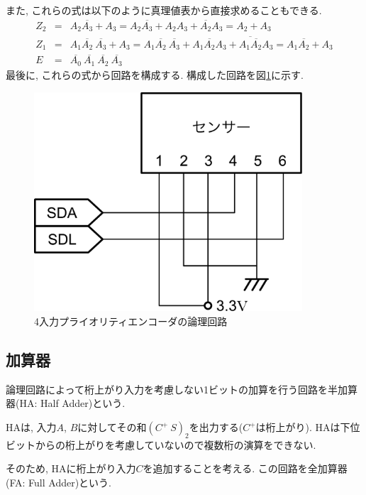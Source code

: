 \documentclass[titlepage]{jsarticle}
\begin{document}
    また, これらの式は以下のように真理値表から直接求めることもできる.
    \begin{eqnarray*}
      Z_2 &=& A_2 \overline{A_3} + A_3 =
        A_2 \overline{A_3} + A_2A_3 + \overline{A_2}A_3 =
        A_2 + A_3 \\
      Z_1 &=& A_1 \overline{A_2} \ \overline{A_3} + A_3 =
        A_1 \overline{A_2} \ \overline{A_3} + A_1 \overline{A_2}A_3 +
          \overline{A_1 \overline{A_2}} A_3 =
        A_1 \overline{A_2} + A_3 \\
      E &=& \overline{A_0} \ \overline{A_1} \ \overline{A_2} \ \overline{A_3}
    \end{eqnarray*}
    最後に, これらの式から回路を構成する.
    構成した回路を図\ref{fig:priority_encoder}に示す.
    \begin{figure}[h]
      \centering
      \includegraphics[width=10cm]{images/haisen.pdf}
      \caption{4入力プライオリティエンコーダの論理回路}
      \label{fig:priority_encoder}
    \end{figure}
  \subsection{加算器} \label{subsec:FA}
    論理回路によって桁上がり入力を考慮しない1ビットの加算を行う回路を半加算器(HA: Half Adder)という.

    HAは, 入力$A$, $B$に対してその和$(C^+ \ S)_2$を出力する($C^+$は桁上がり).
    HAは下位ビットからの桁上がりを考慮していないので複数桁の演算をできない.

    そのため, HAに桁上がり入力$C$を追加することを考える.
    この回路を全加算器(FA: Full Adder)という.
\end{document}
